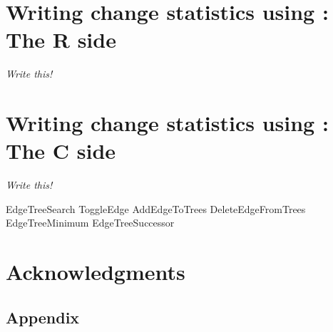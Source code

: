 \documentclass[article]{jss}
\begin{document}
\section[Writing change statistics using ergmuserterms:  The R side]%
{Writing change statistics using :  The R side}
\label{Rside}

{\em Write this!}

\section[Writing change statistics using ergmuserterms:  The C side]%
{Writing change statistics using :  The C side}
\label{Cside}

{\em Write this!}


EdgeTreeSearch
ToggleEdge
AddEdgeToTrees
DeleteEdgeFromTrees
EdgeTreeMinimum
EdgeTreeSuccessor





\section*{Acknowledgments}





\newpage

\begin{appendix}


\section[appendix]{Appendix}
\label{appendix}

\end{appendix}
\end{document}
